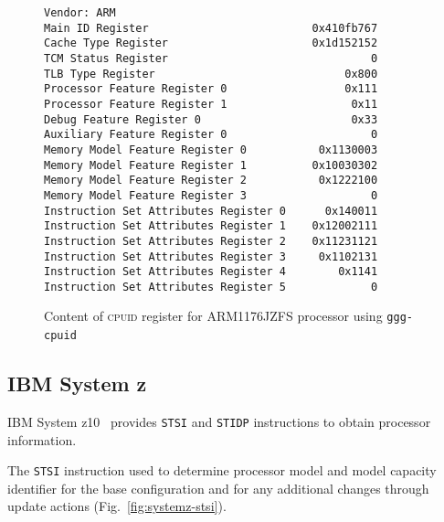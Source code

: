 \documentclass[a4paper,10pt,oneside,unicode]{article}
\newcommand{\cpuid}{\textsc{cpuid} }
\begin{document}
\begin{figure}[htbp]
\centering
\begin{verbatim}
Vendor: ARM
Main ID Register                         0x410fb767
Cache Type Register                      0x1d152152
TCM Status Register                               0
TLB Type Register                             0x800
Processor Feature Register 0                  0x111
Processor Feature Register 1                   0x11
Debug Feature Register 0                       0x33
Auxiliary Feature Register 0                      0
Memory Model Feature Register 0           0x1130003
Memory Model Feature Register 1          0x10030302
Memory Model Feature Register 2           0x1222100
Memory Model Feature Register 3                   0
Instruction Set Attributes Register 0      0x140011
Instruction Set Attributes Register 1    0x12002111
Instruction Set Attributes Register 2    0x11231121
Instruction Set Attributes Register 3     0x1102131
Instruction Set Attributes Register 4        0x1141
Instruction Set Attributes Register 5             0
\end{verbatim}
\caption{Content of \cpuid register for ARM1176JZFS processor using \texttt{ggg-cpuid}~\cite{ggg-cpuid}}\label{fig:ggg-cpuid-arm}
\end{figure}



\subsection{IBM System z}

IBM System z10~\cite{ibm-system-z10} provides \texttt{STSI} and \texttt{STIDP} instructions to obtain processor information.

The \texttt{STSI} instruction used to determine processor model and model capacity identifier for the base configuration and for any additional changes through update actions (Fig.~\ref{fig:systemz-stsi}).

\newcommand{\memsection}[5]{%
    \bytefieldsetup{bitheight=#3\baselineskip}%
    \bitbox[]{4}{%
        \texttt{#1}%
        \\
        \vspace{#3\baselineskip}
        \vspace{-2\baselineskip}
        \vspace{-#3pt}
        \texttt{#2}%
    }%
    \rlap{\bitbox{28}{\color{#5}\rule{\width}{\height}}}%
    \bitbox{28}{#4}%
}
\end{document}

